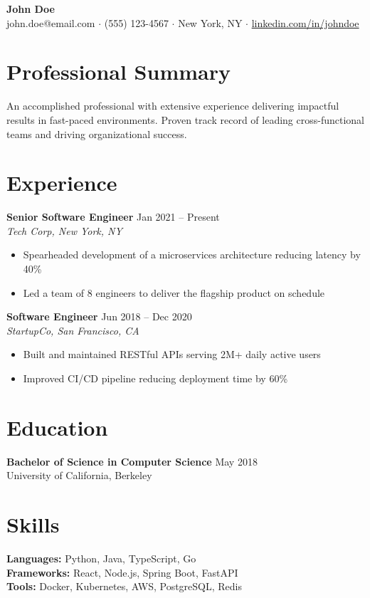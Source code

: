 \documentclass[11pt,letterpaper]{article}
\begin{document}
{\centering
  {\Large\bfseries John Doe}\\[4pt]
  john.doe@email.com $\cdot$ (555) 123-4567 $\cdot$ New York, NY $\cdot$ \href{https://linkedin.com/in/johndoe}{linkedin.com/in/johndoe}
  \par
}
\vspace{4pt}

\section{Professional Summary}
An accomplished professional with extensive experience delivering impactful results in fast-paced environments. Proven track record of leading cross-functional teams and driving organizational success.

\section{Experience}

\textbf{Senior Software Engineer} \hfill Jan 2021 -- Present\\
\textit{Tech Corp, New York, NY}
\begin{itemize}
  \item Spearheaded development of a microservices architecture reducing latency by 40\%
  \item Led a team of 8 engineers to deliver the flagship product on schedule
\end{itemize}

\textbf{Software Engineer} \hfill Jun 2018 -- Dec 2020\\
\textit{StartupCo, San Francisco, CA}
\begin{itemize}
  \item Built and maintained RESTful APIs serving 2M+ daily active users
  \item Improved CI/CD pipeline reducing deployment time by 60\%
\end{itemize}

\section{Education}

\textbf{Bachelor of Science in Computer Science} \hfill May 2018\\
University of California, Berkeley

\section{Skills}
\textbf{Languages:} Python, Java, TypeScript, Go \\
\textbf{Frameworks:} React, Node.js, Spring Boot, FastAPI \\
\textbf{Tools:} Docker, Kubernetes, AWS, PostgreSQL, Redis
\end{document}
